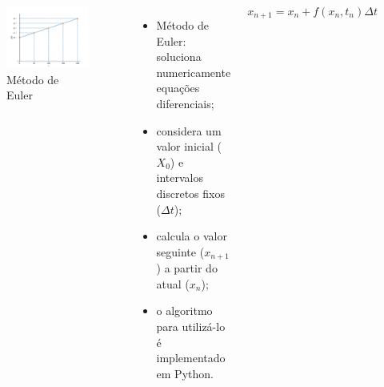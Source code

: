 \begin{frame}
	\begin{columns}[t]
		\column{5cm}
			\begin{figure}[tb]
				\centering
				\caption{Método de Euler}
				\label{fig:euler}
				\includegraphics[width=0.7\linewidth]{figs/euler}
			\end{figure}
		\column{5cm}
		\begin{itemize}
			\item Método de Euler: soluciona numericamente equações diferenciais;
			\item considera um valor inicial ($X_0$) e intervalos discretos fixos ($\Delta t$);
			\item calcula o valor seguinte ($x_{n+1}$) a partir do atual ($x_n$);
			\item o algoritmo para utilizá-lo é implementado em Python.
		\end{itemize}
		\[
			x_{n+1}=x_n+f(x_n,t_n)\Delta t
		\]
	\end{columns}
\end{frame}
